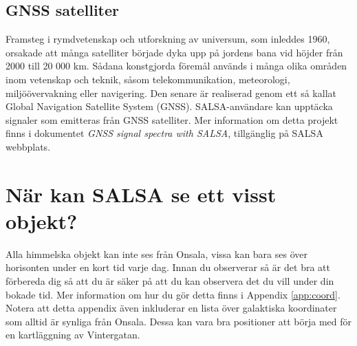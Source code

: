 \subsection{GNSS satelliter}

Framsteg i rymdvetenskap och utforskning av universum, som inleddes 1960, orsakade att
många satelliter började dyka upp på jordens bana vid höjder från 2000 till 20 000 km.
Sådana konstgjorda föremål används i många olika områden inom vetenskap och teknik, såsom
telekommunikation, meteorologi, miljöövervakning eller navigering. Den senare är realiserad genom
ett så kallat Global Navigation Satellite System (GNSS). SALSA-användare kan upptäcka signaler som emitteras från
GNSS satelliter. Mer information om detta projekt finns i dokumentet
\emph {GNSS signal spectra with SALSA}, tillgänglig på SALSA webbplats.

%

\section{När kan SALSA se ett visst objekt?}
Alla himmelska objekt kan inte ses från Onsala, vissa kan bara ses över horisonten
under en kort tid varje dag. Innan du observerar så är det bra att förbereda dig
så att du är säker på att du kan observera det du vill under din bokade tid.
Mer information om hur du gör detta finns i Appendix \ref{app:coord}. Notera att
detta appendix även inkluderar en lista över galaktiska koordinater som alltid
är synliga från Onsala. Dessa kan vara bra positioner att börja med för en 
kartläggning av Vintergatan.

